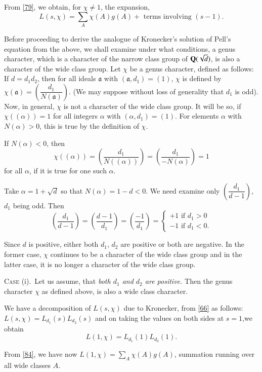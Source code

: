 From \eqref{79}, we obtain, for $\chi\neq 1$, the expansion,
\begin{equation*}
L(s,\chi)=\sum_{A}\chi(A)g(A)+\text{ terms involving }(s-1).\tag{84}\label{84}
\end{equation*}

Before proceeding to derive the analogue of Kronecker's solution of
Pell's equation from the above, we shall examine under what
conditions, a genus character, which is a character of the narrow
class group of $\mathbf{Q}(\sqrt{d})$, is also a character of the wide class
group. Let $\chi$ be a genus character, defined as follows: If
$d=d_{1}d_{2}$, then for all ideals $\mathfrak{a}$ with
$(\mathfrak{a},d_{1})=(1)$, $\chi$ is defined by
$\chi(\mathfrak{a})=\left(\dfrac{d_{1}}{N(\mathfrak{a})}\right)$. (We
may suppose without loss of generality that $d_{1}$ is odd). Now, in
general, $\chi$ is not a character of the wide class group. It will be
so, if $\chi((\alpha))=1$ for all integers $\alpha$ with
$(\alpha,d_{1})=(1)$. For elements $\alpha$ with $N(\alpha)>0$, this
is true by the definition of $\chi$.

If $N(\alpha)<0$, then
$$
\chi((\alpha))=\left(\dfrac{d_{1}}{N((\alpha))}\right)=\left(\dfrac{d_{1}}{-N(\alpha)}\right)=1 
$$
for all $\alpha$, if it is true for one such $\alpha$.

Take $\alpha=1+\sqrt{d}$ so that $N(\alpha)=1-d<0$. We need examine
only $\left(\dfrac{d_{1}}{d-1}\right)$, $d_{1}$ being odd. Then
$$
\left(\frac{d_{1}}{d-1}\right)=\left(\frac{d-1}{d_{1}}\right)=\left(\frac{-1}{d_{1}}\right)=
\begin{cases}
+1\text{ if }d_{1}>0\\
-1 \text{ if } d_{1}<0.
\end{cases}
$$

Since $d$ is positive, either both $d_{1}$, $d_{2}$ are positive or
both are negative. In the former case, $\chi$ continues to be a
character of the wide class group and in the latter case, it is no
longer a character of the wide class group.

\textsc{Case} (i).~Let us assume, that {\em both $d_{1}$ and $d_{2}$
  are positive.} Then the genus character $\chi$ as defined above, is
also a wide class character.

We have a decomposition of $L(s,\chi)$ due to Kronecker, from
\eqref{66} as follows: $L(s,\chi)=L_{d_{1}}(s)L_{d_{2}}(s)$ and on
taking the values on both sides at $s=1$,\pageoriginale we obtain
$$
L(1,\chi)=L_{d_{1}}(1)L_{d_{2}}(1).
$$

From \eqref{84}, we have now $L(1,\chi)=\sum\limits_{A}\chi(A)g(A)$,
summation running over all wide classes $A$.

